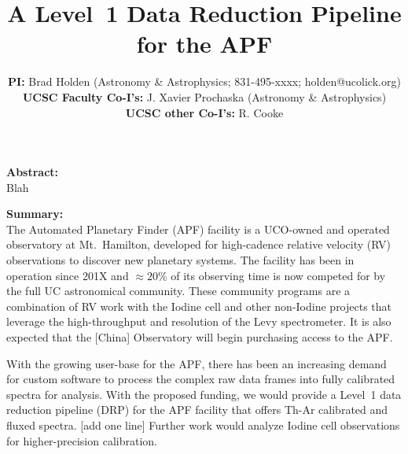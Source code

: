 \documentclass[11pt,preprint]{aastex}
\title{{\Large A Level~1 Data Reduction Pipeline for the APF}}
\author{
{\bf PI:} Brad Holden (Astronomy \& Astrophysics; 831-495-xxxx; holden@ucolick.org) \\
\vskip 0.1in
{\bf UCSC Faculty Co-I's:}
J. Xavier Prochaska (Astronomy \& Astrophysics) \\
\vskip 0.1in
{\bf UCSC other Co-I's:} R. Cooke \\
\vskip 0.1in
}
\begin{document}
\maketitle

	\pagestyle{myheadings}    %


\noindent 
{\bf Abstract:} \\
Blah

\vskip 0.2in

\noindent 
{\bf Summary:} \\
The Automated Planetary Finder (APF) facility is a UCO-owned and operated
observatory at Mt.\ Hamilton, developed for high-cadence relative velocity (RV)
observations to discover new planetary systems.
The facility has been in operation since 201X and $\approx 20\%$ of its observing
time is now competed for by the full UC astronomical community.
These community programs are a combination of RV work with the Iodine cell and
other non-Iodine projects that leverage the high-throughput and resolution
of the Levy spectrometer.  It is also expected that the [China] Observatory
will begin purchasing access to the APF.

With the growing user-base for the APF, there has been an increasing demand
for custom software to process the complex raw data frames into fully
calibrated spectra for analysis.  With the proposed funding, we would provide
a Level~1 data reduction pipeline (DRP) for the APF facility that offers
Th-Ar calibrated and fluxed spectra. [add one line]  
Further work would analyze Iodine cell observations for higher-precision
calibration.

\vskip 0.2in
\end{document}
